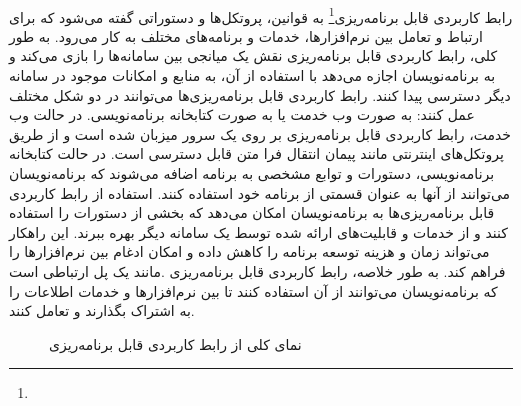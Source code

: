 \paragraph{}
{
    رابط کاربردی قابل برنامه‌ریزی\footnote{} به قوانین، پروتکل‌ها و دستوراتی گفته می‌شود که برای ارتباط و 
    تعامل بین نرم‌افزارها، خدمات و برنامه‌های مختلف به کار می‌رود. به طور کلی، رابط کاربردی قابل برنامه‌ریزی نقش یک میانجی بین سامانه‌ها را بازی
    می‌کند و به برنامه‌نویسان اجازه می‌دهد با استفاده از آن، به منابع و امکانات موجود در سامانه دیگر دسترسی پیدا کنند. رابط کاربردی قابل برنامه‌ریزی‌ها
    می‌توانند در دو شکل مختلف عمل کنند: به صورت وب خدمت یا به صورت کتابخانه برنامه‌نویسی. در حالت وب خدمت، رابط کاربردی قابل برنامه‌ریزی بر روی
    یک سرور میزبان شده است و از طریق پروتکل‌های اینترنتی مانند پیمان انتقال فرا متن قابل دسترسی است. در حالت کتابخانه برنامه‌نویسی، دستورات و توابع مشخصی به
    برنامه اضافه می‌شوند که برنامه‌نویسان می‌توانند از آنها به عنوان قسمتی از برنامه خود استفاده کنند. استفاده از رابط کاربردی قابل برنامه‌ریزی‌ها
    به برنامه‌نویسان امکان می‌دهد که بخشی از دستورات را استفاده کنند و از خدمات و قابلیت‌های ارائه شده توسط یک سامانه دیگر بهره ببرند. این 
    راهکار می‌تواند زمان و هزینه توسعه برنامه را کاهش داده و امکان ادغام بین نرم‌افزارها را فراهم کند. به طور خلاصه، رابط کاربردی قابل برنامه‌ریزی
    .مانند یک پل ارتباطی است که برنامه‌نویسان می‌توانند از آن استفاده کنند تا بین نرم‌افزارها و خدمات اطلاعات را به اشتراک بگذارند و تعامل کنند.
    \begin{figure}[H]
        \caption{نمای کلی از رابط کاربردی قابل برنامه‌ریزی}
        \label{fig:api}
    \end{figure}
}

